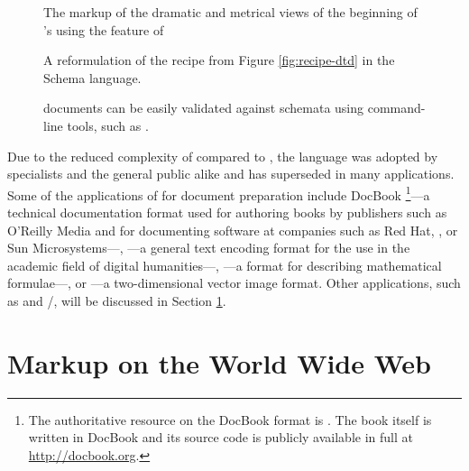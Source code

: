 \documentclass[a5paper,10pt]{book}
\begin{document}
\begin{figure}[hb!]
  
  \caption{The markup of the dramatic and metrical views of the beginning of
    's  using the 
    feature of }
\end{figure}


\begin{figure}[H]
  \caption{A reformulation of the recipe  from Figure
    \ref{fig:recipe-dtd} in the  Schema 
    language.}
  \label{fig:recipe-xsd}
  \caption{A reformulation of the recipe  from Figure
    \ref{fig:recipe-dtd} in the compact syntax of .%
    }
  \label{fig:recipe-rnc}
  \caption{ documents can be easily validated against 
    schemata using command-line tools, such as .}
\end{figure}

Due to the reduced complexity of  compared to , the
language was adopted by specialists and the general public alike and has
superseded  in many applications. Some of the applications of
 for document preparation include DocBook%
\footnote{
  The authoritative resource on the DocBook  format is
  \textcite{walsh10}. The book itself is written in DocBook and its source code
  is publicly available in full at \url{http://docbook.org}.
}---a technical documentation format used for authoring books by publishers such
as O'Reilly Media and for documenting software at companies such as Red Hat,
, or Sun Microsystems---, ---a general text encoding
format for the use in the academic field of digital humanities---,
---a format for describing mathematical formulae---, or
---a two-dimensional vector image format. Other 
applications, such as  and /, will
be discussed in Section \ref{sec:www-markup}.
      
\section{Markup on the World Wide Web}\label{sec:www-markup}
\end{document}
